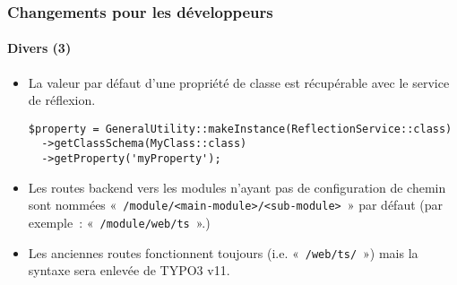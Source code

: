 \begin{frame}[fragile]
	\frametitle{Changements pour les développeurs}
	\framesubtitle{Divers (3)}

	\lstset{basicstyle=\tiny\ttfamily}

	\begin{itemize}
		\item La valeur par défaut d'une propriété de classe est récupérable avec le service de réflexion.

\begin{lstlisting}
$property = GeneralUtility::makeInstance(ReflectionService::class)
  ->getClassSchema(MyClass::class)
  ->getProperty('myProperty');
\end{lstlisting}

		\item Les routes backend vers les modules n'ayant pas de configuration de chemin sont nommées\newline
			«~\texttt{/module/<main-module>/<sub-module>}~» par défaut\newline
			\small
				(par exemple~: «~\texttt{/module/web/ts}~».)
			\normalsize

		\item Les anciennes routes fonctionnent toujours (i.e. «~\texttt{/web/ts/}~») mais la syntaxe sera
			enlevée de TYPO3 v11.

	\end{itemize}

\end{frame}


